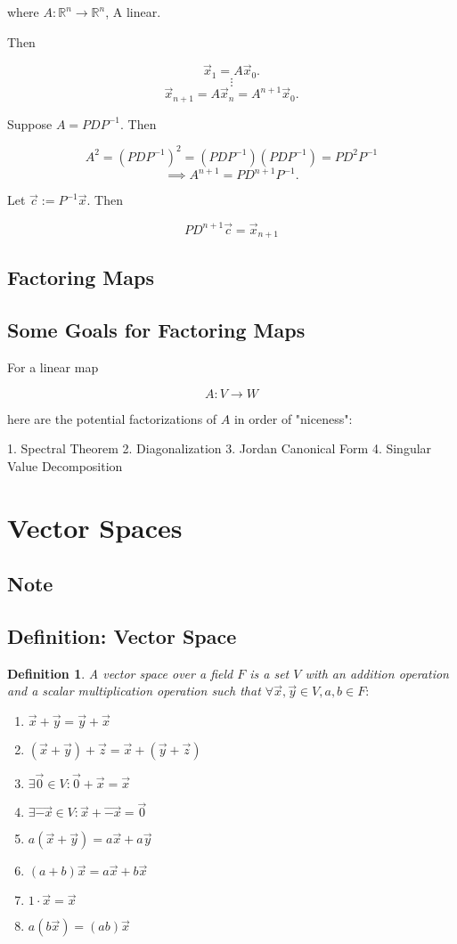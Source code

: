 \documentclass[a4paper,10pt]{article}
\newtheorem{definition}{Definition}[section]
\begin{document}
where $A : \mathbb{R}^n \rightarrow \mathbb{R}^n$, A linear.

Then

$$\vec{x}_1 = A\vec{x}_0.$$
$$\vdots$$
$$\vec{x}_{n+1} = A\vec{x}_n = A^{n+1}\vec{x}_0.$$

Suppose $A=PDP^{-1}$. Then

$$ A^2 = (PDP^{-1})^2 = (PDP^{-1})(PDP^{-1}) = PD^2P^{-1}$$
$$\implies A^{n+1} = PD^{n+1}P^{-1}.$$

Let $\vec{c} := P^{-1}\vec{x}$. Then

$$PD^{n+1}\vec{c} = \vec{x}_{n+1}$$

\subsection{Factoring Maps}
\subsection{Some Goals for Factoring Maps}
For a linear map

$$A : V \rightarrow W$$

here are the potential factorizations of $A$ in order of "niceness":

1. Spectral Theorem
2. Diagonalization
3. Jordan Canonical Form
4. Singular Value Decomposition

\section{Vector Spaces}
\subsection{Note}
\subsection{Definition: Vector Space}
\begin{definition}
	A vector space over a field $F$ is a set $V$ with an addition operation
and a scalar multiplication operation such that $\forall \vec{x},\vec{y} \in V,
a,b\in F:$
\begin{enumerate}
	\item $\vec{x} + \vec{y} = \vec{y} + \vec{x}$
	\item $(\vec{x} + \vec{y}) + \vec{z} = \vec{x} + (\vec{y} + \vec{z})$
	\item $\exists \vec{0} \in V : \vec{0} + \vec{x} = \vec{x}$
	\item $\exists \vec{-x} \in V : \vec{x} + \vec{-x} = \vec{0}$
	\item $a(\vec{x} + \vec{y}) = a\vec{x} + a\vec{y}$
	\item $(a+b)\vec{x} = a\vec{x} + b\vec{x}$
	\item $1 \cdot \vec{x} = \vec{x}$
	\item $a(b\vec{x}) = (ab)\vec{x}$
\end{enumerate}

\end{definition} 
\end{document}
